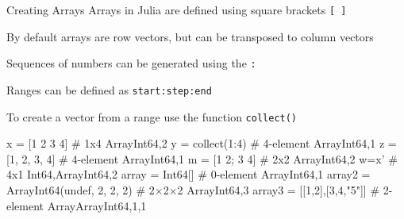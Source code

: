 \documentclass{beamer}
\newenvironment{Boxx}{\begin{tcolorbox}[standard jigsaw, opacityframe=0.8, opacityback=0.0,left=2pt,right=2pt,top=0pt,bottom=0pt]}{\end{tcolorbox}}
\begin{document}
\begin{frame}[fragile]{Creating Arrays}
	Arrays in Julia are defined using square brackets {\color{red}\verb|[ ]|}
	
	By default arrays are row vectors, but can be transposed to column vectors
\pause

	Sequences of numbers can be generated using the {\color{red}\verb|:|}
	 
	Ranges can be defined as {\color{red} \verb|start:step:end|}
	
	To create a vector from a range use the function {\color{red}\verb|collect()|}

\pause
  \begin{Boxx}
  \begin{jllisting}
  x = [1 2 3 4] 			# 1x4 Array{Int64,2}
  y = collect(1:4) 		# 4-element Array{Int64,1}
  z = [1, 2, 3, 4] 		# 4-element Array{Int64,1}
  m = [1 2; 3 4]			# 2x2 Array{Int64,2}
  w=x'						# 4x1 {Int64,Array{Int64,2}}
  array = Int64[]		# 0-element Array{Int64,1}
  array2 = Array{Int64}(undef, 2, 2, 2)	# 2×2×2 Array{Int64,3}
  array3 = [[1,2],[3,4,"5"]] # 2-element Array{Array{Int64,1},1}
	\end{jllisting}
  \end{Boxx}
	

	\pause

	\pause
	\vspace*{0.15cm}

	
\end{frame}
\end{document}
